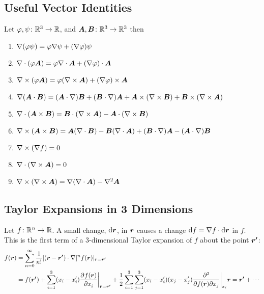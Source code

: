     \subsection{Useful Vector Identities}\label{sec:useful vector identities}
    Let \(\varphi, \psi\colon\mathbb{R}^3\to\mathbb{R}\), and \(\bm{A}, \bm{B}\colon\mathbb{R}^3\to\mathbb{R}^3\) then
    \begin{enumerate}
        \item \(\nabla(\varphi\psi) = \varphi\nabla\psi + (\nabla\varphi)\psi\)
        \item \(\nabla\cdot(\varphi\bm{A}) = \varphi\nabla\cdot\bm{A} + (\nabla\varphi)\cdot\bm{A}\)
        \item \(\nabla\times(\varphi\bm{A}) = \varphi(\nabla\times\bm{A}) + (\nabla\varphi)\times\bm{A}\)
        \item \(\nabla(\bm{A}\cdot\bm{B}) = (\bm{A}\cdot\nabla)\bm{B} + (\bm{B}\cdot\nabla)\bm{A} + \bm{A}\times(\nabla\times\bm{B}) + \bm{B}\times(\nabla\times\bm{A})\)
        \item \(\nabla\cdot(\bm{A}\times\bm{B}) = \bm{B}\cdot(\nabla\times\bm{A}) - \bm{A}\cdot(\nabla\times\bm{B})\)
        \item \(\nabla\times(\bm{A}\times\bm{B}) = \bm{A}(\nabla\cdot\bm{B}) - \bm{B}(\nabla\cdot\bm{A}) + (\bm{B}\cdot\nabla)\bm{A} - (\bm{A}\cdot\nabla)\bm{B}\)
        \item \(\nabla\times(\nabla f) = 0\)
        \item \(\nabla\cdot(\nabla\times\bm{A}) = 0\)
        \item \(\nabla\times(\nabla\times\bm{A}) = \nabla(\nabla\cdot\bm{A}) - \nabla^2\bm{A}\)
    \end{enumerate}
    
    \subsection{Taylor Expansions in 3 Dimensions}
    Let \(f\colon\mathbb{R}^n\to\mathbb{R}\).
    A small change, \(\dd{\bm{r}}\), in \(\bm{r}\) causes a change \(\dd{f} = \nabla f\cdot\dd{\bm{r}}\) in \(f\).
    This is the first term of a 3-dimensional Taylor expansion of \(f\) about the point \(\bm{r'}\):
    \begin{align*}
        f(\bm{r}) &= \sum_{n=0}^\infty \frac{1}{n!}[(\bm{r} - \bm{r'})\cdot\nabla]^n f(\bm{r})|_{\bm{r} = \bm{r'}}\\
        &= f(\bm{r'}) + \sum_{i=1}^3(x_i - x'_i)\pdv[]{f(\bm{r})}{x_i}\biggr|_{\bm{r} = \bm{r'}} + \frac{1}{2}\sum_{i=1}^3\sum_{j=1}^3(x_i - x'_i)(x_j - x'_j)\frac{\partial^2{}}{\partial{f(\bm{r})}\partial{x_j}}\biggr|_{x_i}{\bm{r} = \bm{r'}} + \dotsb
    \end{align*}
    
